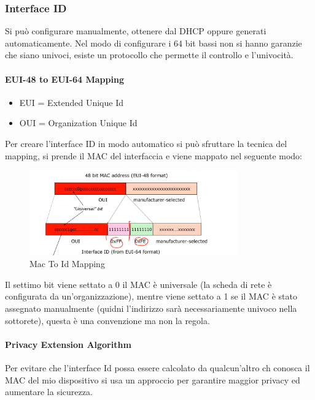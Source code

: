 \documentclass[12pt]{article}
\begin{document}
\subsubsection{Interface ID}
Si pu\`o configurare manualmente, ottenere dal DHCP oppure generati automaticamente. Nel modo di configurare i 64 bit bassi non si hanno garanzie che siano univoci, esiste un protocollo che permette il controllo e l'univocit\`a.

\paragraph{EUI-48 to EUI-64 Mapping}
\begin{itemize}
    \item EUI = Extended Unique Id
    \item OUI = Organization Unique Id
\end{itemize}
Per creare l'interface ID in modo automatico si pu\`o sfruttare la tecnica del mapping, si prende il MAC del interfaccia e viene mappato nel seguente modo:
\begin{figure}[H]
    \centering
    \includegraphics[width=0.8\textwidth]{mac-to-id-mapping.png}
    \caption{Mac To Id Mapping}
    \label{fig:mac-to-id-mapping}
\end{figure}
Il settimo bit viene settato a 0 il MAC \`e universale (la scheda di rete \`e configurata da un'organizzazione), mentre viene settato a 1 se il MAC \`e stato assegnato manualmente (quidni l'indirizzo sar\`a necessariamente univoco nella sottorete), questa \`e una convenzione ma non la regola.

\paragraph{Privacy Extension Algorithm}
Per evitare che l'interface Id possa essere calcolato da qualcun'altro ch conosca il MAC del mio dispositivo si usa un approccio per garantire maggior privacy ed aumentare la sicurezza.
\end{document}
